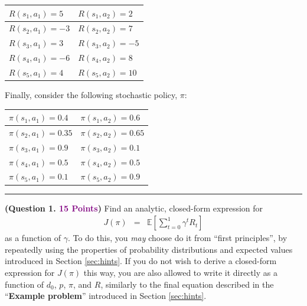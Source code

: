 \documentclass{article}
\newcommand{\POINTS}[1]{\textcolor{purple}{\textbf{{#1}}}}
\begin{document}
\begin{table}[h!!]
\centering
\begin{tabular}{|l|l|}
\hline
$R(s_1,a_1)=5$ & $R(s_1,a_2)=2$ \\ \hline
$R(s_2,a_1)=-3$ & $R(s_2,a_2)=7$ \\ \hline
$R(s_3,a_1)=3$ & $R(s_3,a_2)=-5$  \\ \hline
$R(s_4,a_1)=-6$ & $R(s_4,a_2)=8$ \\ \hline
$R(s_5,a_1)=4$ & $R(s_5,a_2)=10$ \\ \hline
\end{tabular}
\end{table}

\newpage

\noindent Finally, consider the following stochastic policy, $\pi$:

\begin{table}[h!!]
\centering
\begin{tabular}{|l|l|}
\hline
$\pi(s_1,a_1)=0.4$ & $\pi(s_1,a_2)=0.6$  \\ \hline
$\pi(s_2,a_1)=0.35$ & $\pi(s_2,a_2)=0.65$ \\ \hline
$\pi(s_3,a_1)=0.9$ & $\pi(s_3,a_2)=0.1$  \\ \hline
$\pi(s_4,a_1)=0.5$ & $\pi(s_4,a_2)=0.5$ \\ \hline
$\pi(s_5,a_1)=0.1$ & $\pi(s_5,a_2)=0.9$  \\ \hline
\end{tabular}
\end{table}


\vspace{0.5cm}
\noindent\rule{\textwidth}{1pt}
\vspace{0.1cm}


\noindent \textbf{(Question 1. \POINTS{15 Points})} Find an analytic, closed-form expression for
\begin{eqnarray*}
J(\pi) &=& \mathbb{E}\left[  \sum_{t=0}^1 \gamma^t R_t\right]
\end{eqnarray*}
as a function of $\gamma$. To do this, you \textit{may} choose do it from ``first principles'', by repeatedly using the properties of probability distributions and expected values introduced in Section \ref{sec:hints}. If you do not wish to derive a closed-form expression for $J(\pi)$ this way, you are also allowed to write it directly as a function of $d_0$, $p$, $\pi$, and $R$, similarly to the final equation described in the ``\textbf{Example problem}'' introduced in Section \ref{sec:hints}.
\end{document}
